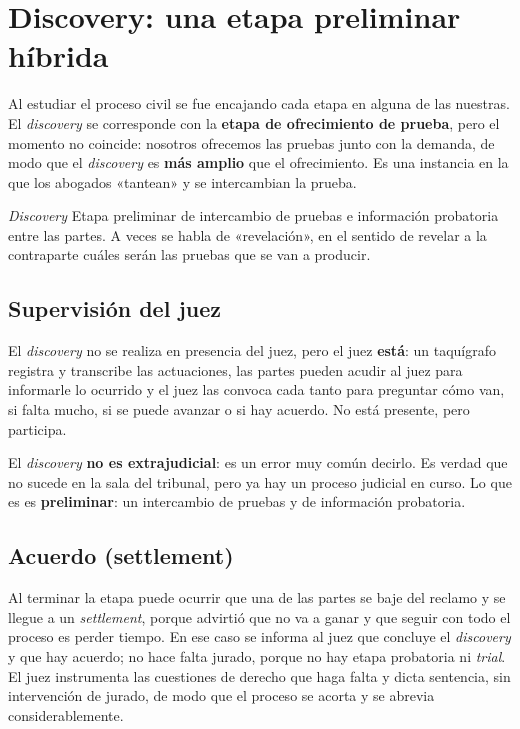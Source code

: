 \documentclass[12pt,oneside]{book}
\begin{document}
\section{Discovery: una etapa preliminar híbrida}

Al estudiar el proceso civil se fue encajando cada etapa en alguna de las nuestras. El \textit{discovery} se corresponde con la \textbf{etapa de ofrecimiento de prueba}, pero el momento no coincide: nosotros ofrecemos las pruebas junto con la demanda, de modo que el \textit{discovery} es \textbf{más amplio} que el ofrecimiento. Es una instancia en la que los abogados «tantean» y se intercambian la prueba.

\begin{definition}{\textit{Discovery}}
Etapa preliminar de intercambio de pruebas e información probatoria entre las partes. A veces se habla de «revelación», en el sentido de revelar a la contraparte cuáles serán las pruebas que se van a producir.
\end{definition}

\subsection{Supervisión del juez}

El \textit{discovery} no se realiza en presencia del juez, pero el juez \textbf{está}: un taquígrafo registra y transcribe las actuaciones, las partes pueden acudir al juez para informarle lo ocurrido y el juez las convoca cada tanto para preguntar cómo van, si falta mucho, si se puede avanzar o si hay acuerdo. No está presente, pero participa.

\begin{important}
El \textit{discovery} \textbf{no es extrajudicial}: es un error muy común decirlo. Es verdad que no sucede en la sala del tribunal, pero ya hay un proceso judicial en curso. Lo que es es \textbf{preliminar}: un intercambio de pruebas y de información probatoria.
\end{important}

\subsection{Acuerdo (settlement)}

Al terminar la etapa puede ocurrir que una de las partes se baje del reclamo y se llegue a un \textit{settlement}, porque advirtió que no va a ganar y que seguir con todo el proceso es perder tiempo. En ese caso se informa al juez que concluye el \textit{discovery} y que hay acuerdo; no hace falta jurado, porque no hay etapa probatoria ni \textit{trial}. El juez instrumenta las cuestiones de derecho que haga falta y dicta sentencia, sin intervención de jurado, de modo que el proceso se acorta y se abrevia considerablemente.
\end{document}
